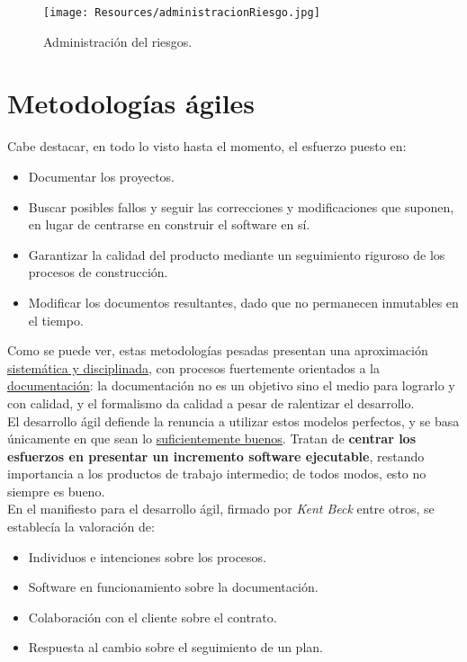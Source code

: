 \begin{figure}[H]
   \centering
   \texttt{[image: Resources/administracionRiesgo.jpg]}
   \caption{Administración del riesgos.}
   \label{fig:administracionRiesgo}
\end{figure}





\section{Metodologías ágiles}

Cabe destacar, en todo lo visto hasta el momento, el esfuerzo puesto en:

\begin{itemize}
   \item Documentar los proyectos.
   \item Buscar posibles fallos y seguir las correcciones y modificaciones que suponen, en lugar de centrarse en construir el software en sí.
   \item Garantizar la calidad del producto mediante un seguimiento riguroso de los procesos de construcción.
   \item Modificar los documentos resultantes, dado que no permanecen inmutables en el tiempo.
\end{itemize}

Como se puede ver, estas metodologías pesadas presentan una aproximación \uline{sistemática y disciplinada}, con procesos fuertemente orientados a la \uline{documentación}: la documentación no es un objetivo sino el medio para lograrlo y con calidad, y el formalismo da calidad a pesar de ralentizar el desarrollo.\\

El desarrollo ágil defiende la renuncia a utilizar estos modelos perfectos, y se basa únicamente en que sean lo \uline{suficientemente buenos}. Tratan de \textbf{centrar los esfuerzos en presentar un incremento software ejecutable}, restando importancia a los productos de trabajo intermedio; de todos modos, esto no siempre es bueno.\\

En el manifiesto para el desarrollo ágil, firmado por \textit{Kent Beck} entre otros, se establecía la valoración de:

\begin{itemize}
   \item Individuos e intenciones sobre los procesos.
   \item Software en funcionamiento sobre la documentación.
   \item Colaboración con el cliente sobre el contrato.
   \item Respuesta al cambio sobre el seguimiento de un plan.
\end{itemize}

